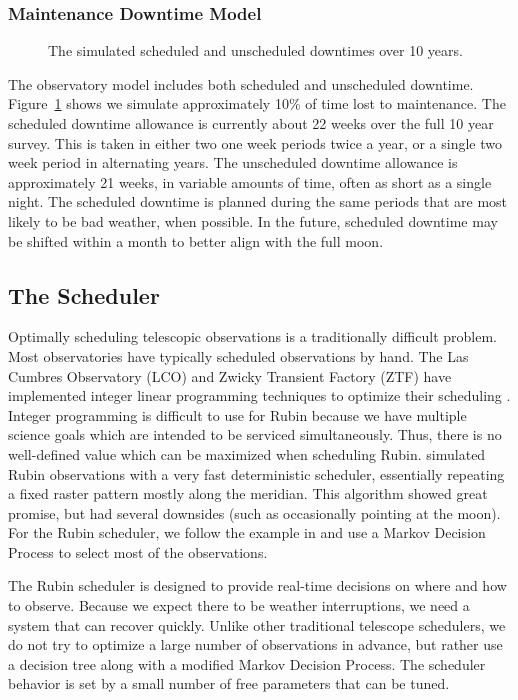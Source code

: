 \subsubsection{Maintenance Downtime Model}

\begin{figure}
\caption{The simulated scheduled and unscheduled downtimes over 10 years.}\label{fig:downtime}
\end{figure}

The observatory model includes both scheduled and unscheduled downtime. Figure~\ref{fig:downtime} shows we simulate approximately 10\% of time lost to maintenance. The scheduled downtime allowance is currently about 22 weeks over the full 10 year survey. This is taken in either two one week periods twice a year, or a single two week period in alternating years. The unscheduled downtime allowance is approximately 21 weeks, in variable amounts of time, often as short as a single night. The scheduled downtime is planned during the same periods that are most likely to be bad weather, when possible. In the future, scheduled downtime may be shifted within a month to better align with the full moon.


\subsection{The Scheduler}

Optimally scheduling telescopic observations is a traditionally difficult problem. Most observatories have typically scheduled observations by hand. The  Las Cumbres Observatory (LCO) and Zwicky Transient Factory (ZTF) have implemented integer linear programming techniques to optimize their scheduling \citep{Lampoudi15, Bellm19}. Integer programming is difficult to use for Rubin because we have multiple science goals which are intended to be serviced simultaneously. Thus, there is no well-defined value which can be maximized when scheduling Rubin. \citet{Rothchild19} simulated Rubin observations with a very fast deterministic scheduler, essentially repeating a fixed raster pattern mostly along the meridian. This algorithm showed great promise, but had several downsides (such as occasionally pointing at the moon). For the Rubin scheduler, we follow the example in \citet{Naghib19} and use a Markov Decision Process to select most of the observations.

The Rubin scheduler is designed to provide real-time decisions on where and how to observe. Because we expect there to be weather interruptions, we need a system that can recover quickly. Unlike other traditional telescope schedulers, we do not try to optimize a large number of observations in advance, but rather use a decision tree along with a modified Markov Decision Process. The scheduler behavior is set by a small number of free parameters that can be tuned.

